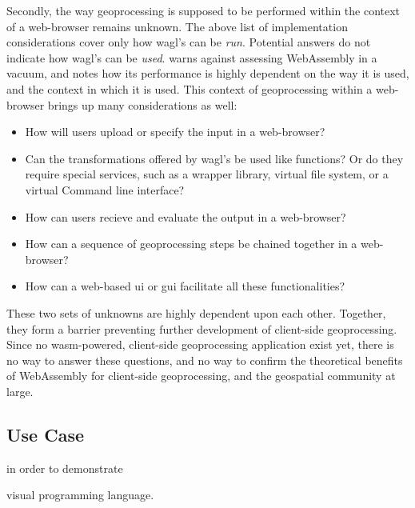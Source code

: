 Secondly, the way geoprocessing is supposed to be performed within the context of a web-browser remains unknown. The above list of implementation considerations cover only how \ac{wagl}'s can be \emph{run}. Potential answers do not indicate how \ac{wagl}'s can be \emph{used}. \cite{jangda_not_2019} warns against assessing WebAssembly in a vacuum, and notes how its performance is highly dependent on the way it is used, and the context in which it is used. This context of geoprocessing within a web-browser brings up many considerations as well: 

\begin{itemize}
  \item How will users upload or specify the input in a web-browser?
  \item Can the transformations offered by \ac{wagl}'s be used like functions? Or do they require special services, such as a wrapper library, virtual file system, or a virtual Command line interface? 
  \item How can users recieve and evaluate the output in a web-browser?
  \item How can a sequence of geoprocessing steps be chained together in a web-browser?
  \item How can a web-based \ac{ui} or \ac{gui} facilitate all these functionalities?
\end{itemize}

These two sets of unknowns are highly dependent upon each other. Together, they form a barrier preventing further development of client-side geoprocessing. Since no wasm-powered, client-side geoprocessing application exist yet, there is no way to answer these questions, and no way to confirm the theoretical benefits of WebAssembly for client-side geoprocessing, and the geospatial community at large.



\subsection{Use Case}


in order to demonstrate 

visual programming language.




\newpage

